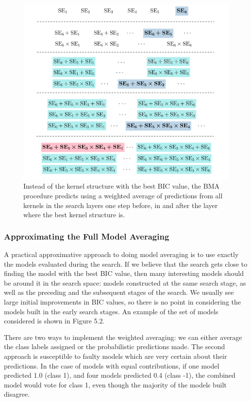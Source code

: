 \documentclass[a4paper,12pt ]{report}
\begin{document}
\begin{figure} [!t]

\caption{{Instead of the kernel structure with the best BIC value, the BMA procedure predicts using a weighted average of predictions from all kernels in the search layers one step before, in and after the layer where the best kernel structure is.}}
\centering
\includegraphics[trim=0cm 0cm 0cm 0cm, width=1\textwidth] {figures/bma2.png}

\end{figure}

\subsubsection*{Approximating the Full Model Averaging}

A practical approximative approach to doing model averaging is to use exactly the models evaluated during the search. If we believe that the search gets close to finding the model with the best BIC value, then many interesting models should be around it in the search space: models constructed at the same search stage, as well as the preceding and the subsequent stages of the search. We usually see large initial improvements in BIC values, so there is no point in considering the models built in the early search stages. An example of the set of models considered is shown in Figure 5.2.

There are two ways to implement the weighted averaging: we can either average the class labels assigned or the probabilistic predictions made. The second approach is susceptible to faulty models which are very certain about their predictions. In the case of models with equal contributions, if one model predicted 1.0 (class 1), and four models predicted 0.4 (class -1), the combined model would vote for class 1, even though the majority of the models built disagree.
\end{document}
